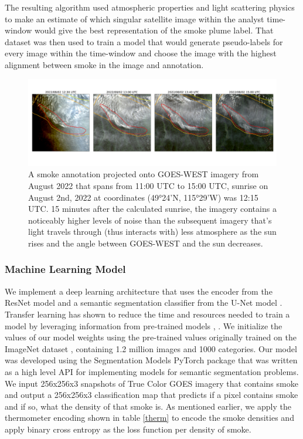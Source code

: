 \documentclass{ametsocV6.1}
\begin{document}
The resulting algorithm used atmospheric properties and light scattering physics to make an estimate of which singular satellite image within the analyst time-window would give the best representation of the smoke plume label. That dataset was then used to train a model that would generate pseudo-labels for every image within the time-window and choose the image with the highest alignment between smoke in the image and annotation.


\begin{figure}
    \centering
    \includegraphics[width=16cm]{figures/timelapse_G17_2.png}
    \caption{A smoke annotation projected onto GOES-WEST imagery from August 2022 that spans from 11:00 UTC to 15:00 UTC, sunrise on August 2nd, 2022 at coordinates (49°24'N, 115°29'W) was 12:15 UTC. 15 minutes after the calculated sunrise, the imagery contains a noticeably higher levels of noise than the subsequent imagery that's light travels through (thus interacts with) less atmosphere as the sun rises and the angle between GOES-WEST and the sun decreases. }\label{G17_sunrise}
\end{figure}




\subsubsection*{Machine Learning Model} 

We implement a deep learning architecture that uses the encoder from the ResNet model \citep{resnet} and a semantic segmentation classifier from the U-Net model \citep{unet}. Transfer learning has shown to reduce the time and resources needed to train a model by leveraging information from pre-trained models \citep{transfer}, \citep{transfer2}.  We initialize the values of our model weights using the pre-trained values originally trained on the ImageNet dataset \citep{imgnet}, containing 1.2 million images and 1000 categories. Our model was developed using the Segmentation Models PyTorch package \citep{semantic} that was written as a high level API for implementing models for semantic segmentation problems.  We input 256x256x3 snapshots of True Color GOES imagery that contains smoke and output a 256x256x3 classification map that predicts if a pixel contains smoke and if so, what the density of that smoke is. As mentioned earlier, we apply the thermometer encoding shown in table \ref{therm} to encode the smoke densities and apply binary cross entropy as the loss function per density of smoke. 
\end{document}
